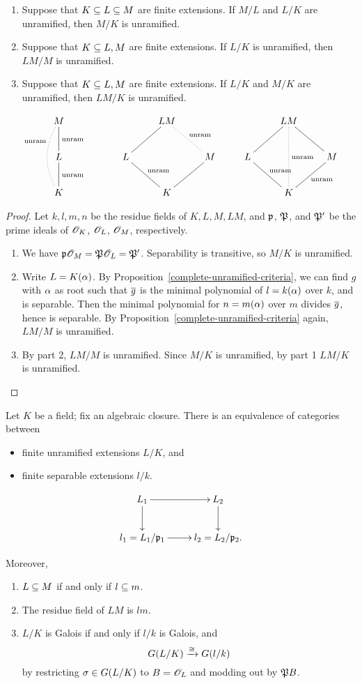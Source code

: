 \begin{pr}$\,$
\begin{enumerate}
\item
Suppose that $K\subseteq L\subseteq M$ are finite extensions. If $M/L$ and $L/K$ are unramified, then $M/K$ is unramified.
\item
Suppose that $K\subseteq L,M$ are finite extensions. If $L/K$ is unramified, then $LM/M$ is unramified.
\item
Suppose that $K\subseteq L,M$ are finite extensions. If $L/K$ and $M/K$ are unramified, then $LM/K$ is unramified.
\end{enumerate}
\[
\xymatrix{
M\ar@{-}[d]^{\text{unram}}\ar@/_1pc/@{.}[dd]_<<<<<<<{\text{unram}}&&&LM\ar@{-}[ld]\ar@{.}[rd]^{\text{unram}}&&&LM\ar@{.}[dd]^{\text{unram}}\ar@{-}[rd]\ar@{-}[ld]&\\
L\ar@{-}[d]^{\text{unram}}&&L\ar@{-}[rd]^{\text{unram}}&& M\ar@{-}[ld]&L\ar@{-}[rd]^{\text{unram}}&&M\ar@{-}[ld]^{\text{unram}}\\
K&&&K&&&K&
}
\]
\end{pr}
\begin{proof}
Let $k,l,m,n$ be the residue fields of $K,L,M,LM$, and $\mathfrak{p}$, $\mathfrak{P}$, and $\mathfrak{P}'$ be the prime ideals of $\mathscr{O}_K$, $\mathscr{O}_L$, $\mathscr{O}_M$, respectively.
\begin{enumerate}
\item We have $\mathfrak{p}\mathscr{O}_M=\mathfrak{P}\mathscr{O}_L=\mathfrak{P}'$. Separability is transitive, so $M/K$ is unramified.
\item Write $L=K(\alpha)$. By Proposition~\ref{complete-unramified-criteria}, we can find $g$ with $\alpha$ as root such that $\overline{g}$ is the minimal polynomial of $l=k(\alpha)$ over $k$, and is separable. Then the minimal polynomial for $n=m(\alpha)$ over $m$ divides $\overline{g}$, hence is separable. By Proposition~\ref{complete-unramified-criteria} again, $LM/M$ is unramified.
\item By part 2, $LM/M$ is unramified. Since $M/K$ is unramified, by part 1 $LM/K$ is unramified.\qedhere
\end{enumerate}
\end{proof}
\begin{thm}
Let $K$ be a field; fix an algebraic closure.
There is an equivalence of categories between
\begin{itemize}
\item finite unramified extensions $L/K$, and  
\item finite separable extensions $l/k$.
\end{itemize}
\[
\xymatrix{
L_1\ar[r]\ar[d] &L_2\ar[d]\\
l_1=L_1/\mfp_1\ar[r]&l_2=L_2/\mfp_2.
}
\]

Moreover,
\begin{enumerate}
\item $L\subseteq M$ if and only if $l\subseteq m$.
\item The residue field of $LM$ is $lm$.
\item $L/K$ is Galois if and only if $l/k$ is Galois, and
\[
G(L/K)\xrightarrow{\cong} G(l/k)
\]
by restricting $\sigma\in G(L/K)$ to $B=\mathscr{O}_L$ and modding out by $\mathfrak{P} B$.
\end{enumerate}
\end{thm}
